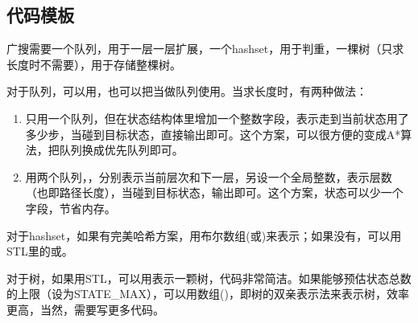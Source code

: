 \subsection{代码模板}
广搜需要一个队列，用于一层一层扩展，一个hashset，用于判重，一棵树（只求长度时不需要），用于存储整棵树。

对于队列，可以用，也可以把当做队列使用。当求长度时，有两种做法：
\begin{enumerate}
	\item 只用一个队列，但在状态结构体里增加一个整数字段，表示走到当前状态用了多少步，当碰到目标状态，直接输出即可。这个方案，可以很方便的变成A*算法，把队列换成优先队列即可。
	\item 用两个队列，，分别表示当前层次和下一层，另设一个全局整数，表示层数（也即路径长度），当碰到目标状态，输出即可。这个方案，状态可以少一个字段，节省内存。
\end{enumerate}

对于hashset，如果有完美哈希方案，用布尔数组(或)来表示；如果没有，可以用STL里的或。

对于树，如果用STL，可以用表示一颗树，代码非常简洁。如果能够预估状态总数的上限（设为STATE_MAX），可以用数组()，即树的双亲表示法来表示树，效率更高，当然，需要写更多代码。


